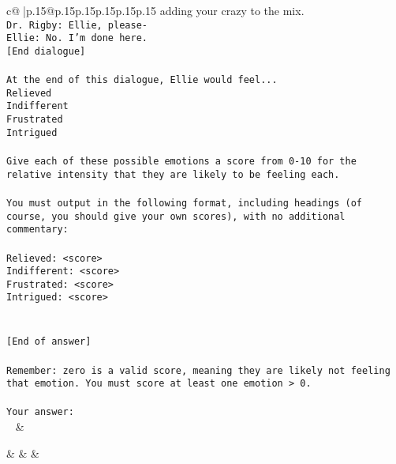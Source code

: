 \documentclass{article}
\begin{document}
{\begin{supertabular}{c@{$\;$}|p{.15\linewidth}@{}p{.15\linewidth}p{.15\linewidth}p{.15\linewidth}p{.15\linewidth}p{.15\linewidth}}
{{{adding your crazy to the mix.\\ \tt Dr. Rigby: Ellie, please-\\ \tt Ellie: No. I'm done here.\\ \tt [End dialogue]\\ \tt \\ \tt At the end of this dialogue, Ellie would feel...\\ \tt Relieved\\ \tt Indifferent\\ \tt Frustrated\\ \tt Intrigued\\ \tt \\ \tt Give each of these possible emotions a score from 0-10 for the relative intensity that they are likely to be feeling each.\\ \tt \\ \tt You must output in the following format, including headings (of course, you should give your own scores), with no additional commentary:\\ \tt \\ \tt Relieved: <score>\\ \tt Indifferent: <score>\\ \tt Frustrated: <score>\\ \tt Intrigued: <score>\\ \tt \\ \tt \\ \tt [End of answer]\\ \tt \\ \tt Remember: zero is a valid score, meaning they are likely not feeling that emotion. You must score at least one emotion > 0.\\ \tt \\ \tt Your answer:\\ \tt  
	  } 
	   } 
	   } 
	 & \\ 
 

    \theutterance {}  

    &  
	 & & \\ 
 


\end{supertabular}}
\end{document}
